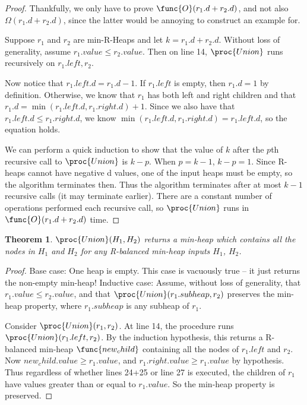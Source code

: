 \documentclass[11pt, answers]{exam}
\theoremstyle{plain}
\newtheorem{theorem}{Theorem}
\theoremstyle{definition}
\begin{document}
\begin{questions}
\begin{parts}
\begin{solution}
\begin{proof}
Thankfully, we only have to prove $\func{O}(r_1 .d + r_2 .d)$, and not also $\Omega(r_1 .d + r_2 .d)$, since the latter would be annoying to construct an example for. 

Suppose $r_1$ and $r_2$ are min-R-Heaps and let $k = r_1 .d + r_2 .d$. Without loss of generality, assume $r_1.value \leq r_2.value$. Then on line 14, $\proc{Union}$ runs recursively on $r_1.left, r_2$. 

Now notice that $r_1.left.d = r_1.d - 1$. If $r_1.left$ is empty, then $r_1.d = 1$ by definition. Otherwise, we know that $r_1$ has both left and right children and that $r_1.d = \min(r_1.left.d, r_1.right.d) + 1$. Since we also have that $r_1.left.d  \leq r_1.right.d$, we know
$\min(r_1.left.d, r_1.right.d) = r_1.left.d$, so the equation holds.

We can perform a quick induction to show that the value of $k$ after the $p$th recursive call to $\proc{Union}$ is $k-p$. When $p = k-1$, $k-p = 1$. Since R-heaps cannot have negative d values, one of the input heaps must be empty, so the algorithm terminates then. Thus the algorithm terminates after at most $k-1$ recursive calls (it may terminate earlier). There are a constant number of operations performed each recursive call, so $\proc{Union}$ runs in $\func{O}(r_1 .d + r_2 .d)$ time.
\end{proof}

\begin{theorem}
$\proc{Union}(H_1, H_2)$ returns a min-heap which contains all the nodes in $H_1$ and $H_2$ for any R-balanced min-heap inputs $H_1$, $H_2$.
\end{theorem}

\begin{proof}
Base case: One heap is empty. This case is vacuously true -- it just returns the non-empty min-heap!
Inductive case: Assume, without loss of generality, that $r_1.value \leq r_2.value$, and that $\proc{Union}(r_1.subheap, r_2)$ preserves the min-heap property, where $r_1.subheap$ is any subheap of $r_1$.

Consider $\proc{Union}(r_1, r_2)$. At line 14, the procedure runs $\proc{Union}(r_1.left, r_2)$. By the induction hypothesis, this returns a R-balanced min-heap $\func{new_child}$ containing all the nodes of $r_1.left$ and $r_2$. Now $new_child.value \geq r_1.value$, and $r_1.right.value \geq r_1.value$ by hypothesis. Thus regardless of whether lines 24+25 or line 27 is executed, the children of $r_1$ have values greater than or equal to $r_1.value$. So the min-heap property is preserved.


\end{proof}
\end{solution}
\end{parts}
\end{questions}
\end{document}
